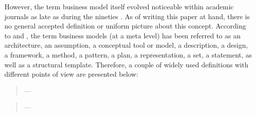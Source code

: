 However, the term business model itself evolved noticeable within academic journals as late as during the nineties . As of writing this paper at hand, there is no general accepted definition or uniform picture about this concept. According to \citet[p. 726]{Morris2005} and \citet[p. 1022]{Zott2011}, the term business models (at a meta level) has been referred to as an architecture, an assumption, a conceptual tool or model, a description, a design, a framework, a method, a pattern, a plan, a representation, a set, a statement, as well as a structural template. Therefore, a couple of widely used definitions with different points of view are presented below:
	
\begin{quotation}\vspace*{-5pt}{\slshape 
[A business model is] an architecture for the product, service and information flows, including a description of the various business actors and their roles; and a description of the potential benefits for the various business actors; and a description of the sources of revenues.}
\vspace*{-7pt}
\begin{flushright}
	--- \citealp[p. 2]{Timmers1998}
\end{flushright}
\end{quotation}


\begin{quotation}\vspace*{-5pt}{\slshape 
A business model depicts the content, structure, and governance of transactions designed so as to create value through the exploitation of business opportunities.}
\vspace*{-7pt}
\begin{flushright}
	--- \citealp[p. 511]{Amit2001}
\end{flushright}
\end{quotation}

